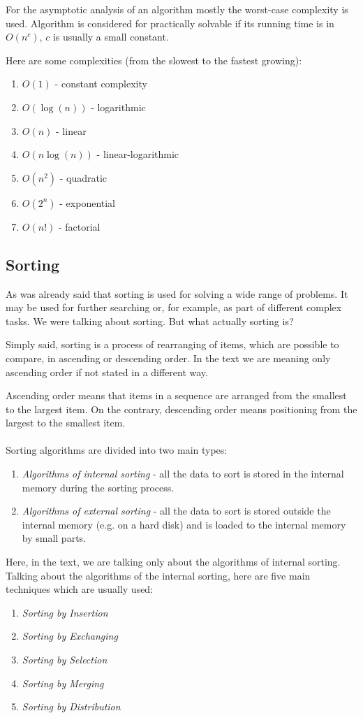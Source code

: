 \documentclass[
  field=inf,
  biblatex,
  language=english,
  glossaries,
  theorems=false,
  index
]{kidiplom}
\begin{document}
For the asymptotic analysis of an algorithm mostly the worst-case complexity is used. Algorithm is considered for practically solvable if its running time is in $O(n^c)$, $c$ is usually a small constant. 

Here are some complexities (from the slowest to the fastest growing):
\begin{enumerate}
 \item $O(1)$ - constant complexity
 \item $O(\log(n))$ - logarithmic
 \item $O(n)$ - linear
 \item $O(n \log(n))$ - linear-logarithmic
 \item $O(n^2)$ - quadratic
 \item $O(2^n)$ - exponential
 \item $O(n!)$ - factorial
\end{enumerate}

\subsection{Sorting}

As was already said that sorting is used for solving a wide range of problems. It may be used for further searching or, for example, as part of different complex tasks. We were talking about sorting. But what actually sorting is?

Simply said, sorting is a process of rearranging of items, which are possible to compare, in ascending or descending order. In the text we are meaning only ascending order if not stated in a different way.

Ascending order means that items in a sequence are arranged from the smallest to the largest item. On the contrary, descending order means positioning from the largest to the smallest item.
\\\\
Sorting algorithms are divided into two main types:
\begin{enumerate}
	\item \textit{Algorithms of internal sorting} - all the data to sort is stored in the internal memory during the sorting process. 
	\item \textit{Algorithms of external sorting} - all the data to sort is stored outside the internal memory (e.g. on a hard disk) and is loaded to the internal memory by small parts.
\end{enumerate}

Here, in the text, we are talking only about the algorithms of internal sorting. Talking about the algorithms of the internal sorting, here are five main techniques which are usually used\cite{knuth3}:
\begin{enumerate}
	\item \textit{Sorting by Insertion}
	\item \textit{Sorting by Exchanging}
	\item \textit{Sorting by Selection}
	\item \textit{Sorting by Merging}
	\item \textit{Sorting by Distribution}
\end{enumerate}
\end{document}
